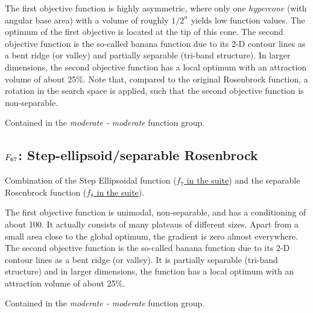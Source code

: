 The first objective function is highly asymmetric, where only one \emph{hypercone}
(with angular base area) with a volume of roughly \(1/2^n\) yields low function values.
The optimum of the first objective is located at the tip of this cone.
The second objective function is the so-called banana function due to its 2-D contour lines
as a bent ridge (or valley) and partially separable (tri-band structure). In larger dimensions,
the second objective function has a local optimum with an attraction volume of about 25\%.
Note that, compared to the original Rosenbrock function, a rotation in the search space
is applied, such that the second objective function is non-separable.

Contained in the \emph{moderate - moderate} function group.



\subsection[\texorpdfstring{\protect\(F_{67}\protect\): Step-ellipsoid/separable Rosenbrock}{F67: Step-ellipsoid/separable Rosenbrock}]{\texorpdfstring{\protect\(F_{67}\protect\): Step-ellipsoid/separable Rosenbrock}{}}
\label{index:f67}\label{index:step-ellipsoid-separable-rosenbrock}
Combination of the Step Ellipsoidal function (\href{https://coco.gforge.inria.fr/downloads/download16.00/bbobdocfunctions.pdf\#page=35}{\(f_7\) in the \bbob suite}) and the
separable Rosenbrock function (\href{https://coco.gforge.inria.fr/downloads/download16.00/bbobdocfunctions.pdf\#page=40}{\(f_8\) in the \bbob suite}).

The first objective function is unimodal, non-separable, and has a
conditioning of about 100. It actually consists of many plateaus of different sizes.
Apart from a small area close to the global optimum, the gradient is zero almost everywhere.
The second objective function is the so-called banana function due to its 2-D contour lines
as a bent ridge (or valley). It is partially separable (tri-band structure) and
in larger dimensions, the function has a local optimum with an attraction volume of about 25\%.

Contained in the \emph{moderate - moderate} function group.



